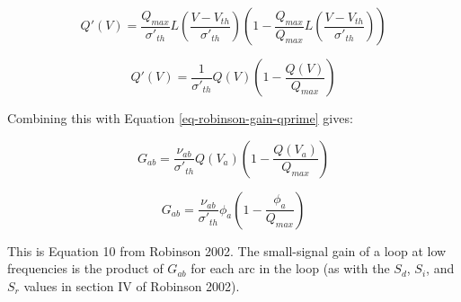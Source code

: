 \begin{equation}
Q'(V) = \frac{Q_{max}}{\sigma'_{th}}
L \left ( \frac{V - V_{th}}{\sigma'_{th}} \right )
\left ( 1 - \frac{Q_{max}}{Q_{max}}
L \left ( \frac{V - V_{th}}{\sigma'_{th}} \right ) \right )
\end{equation}

\begin{equation}
Q'(V) = \frac{1}{\sigma'_{th}} Q(V) \left ( 1 - \frac{Q(V)}{Q_{max}} \right )
\end{equation}

Combining this with Equation \ref{eq-robinson-gain-qprime} gives:

\begin{equation}
G_{ab} = \frac{\nu_{ab}}{\sigma'_{th}}
Q(V_a) \left ( 1 - \frac{Q(V_a)}{Q_{max}} \right )
\end{equation}

\begin{equation}
G_{ab} = \frac{\nu_{ab}}{\sigma'_{th}}
\phi_a \left ( 1 - \frac{\phi_a}{Q_{max}} \right )
\label{eq-robinson-gain}
\end{equation}

This is Equation 10 from Robinson 2002. The small-signal gain of a loop at
low frequencies is the product of $G_{ab}$ for each arc in the loop
(as with the $S_d$, $S_i$, and $S_r$ values in section IV of Robinson 2002).


%
%
